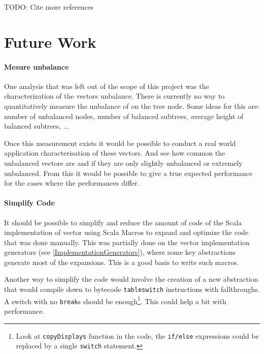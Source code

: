 \color{red} TODO: Cite more references \color{black}



\section{Future Work}

\paragraph{Mesure unbalance}
One analysis that was left out of the scope of this project was the characterization of the vectors unbalance. There is currently no way to quantitatively measure the unbalance of on the tree node. Some ideas for this are: number of unbalanced nodes, number of balanced subtrees, average height of balanced subtrees, ... 

Once this measurement exists it would be possible to conduct a real world application characterisation of these vectors. And see how common the unbalanced vectors are and if they are only slightly unbalanced or extremely unbalanced. From this it would be possible to give a true expected performance for the cases where the performances differ.

\paragraph{Simplify Code}
It should be possible to simplify and reduce the amount of code of the Scala implementation of vector using Scala Macros \cite{EPFL-CONF-186844}  to expand and optimize the code that was done manually. This was partially done on the vector implementation generators (see \ref{ImplementationGenerators}), where some key abstractions generate most of the expansions. This is a good basis to write such macros.

Another way to simplify the code would involve the creation of a new abstraction that would compile down to bytecode \texttt{tableswitch} instructions with fallthroughs. A switch with no \texttt{break}s should be enough\footnote{Look at \texttt{copyDisplays} function in the code, the \texttt{if/else} expressions could be replaced by a single \texttt{switch} statement.}. This could help a bit with performance.

